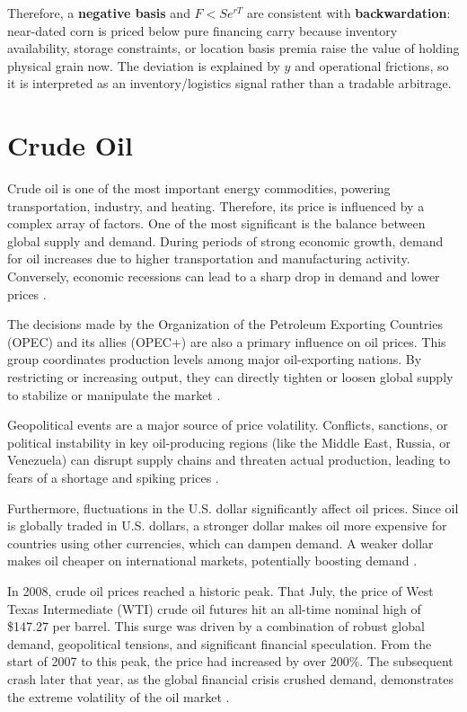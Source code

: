 \documentclass[10pt,a4paper]{article} %
\begin{document}
Therefore, a \textbf{negative basis} and $F<S e^{rT}$ are consistent with \textbf{backwardation}: near-dated corn is priced below pure financing carry because inventory availability, storage constraints, or location basis premia raise the value of holding physical grain now. The deviation is explained by $y$ and operational frictions, so it is interpreted as an inventory/logistics signal rather than a tradable arbitrage.


\section{Crude Oil}
Crude oil is one of the most important energy commodities, powering transportation, industry, and heating. Therefore, its price is influenced by a complex array of factors. One of the most significant is the balance between global supply and demand. During periods of strong economic growth, demand for oil increases due to higher transportation and manufacturing activity. Conversely, economic recessions can lead to a sharp drop in demand and lower prices \citep{eia_prices_2023}.

The decisions made by the Organization of the Petroleum Exporting Countries (OPEC) and its allies (OPEC+) are also a primary influence on oil prices. This group coordinates production levels among major oil-exporting nations. By restricting or increasing output, they can directly tighten or loosen global supply to stabilize or manipulate the market \citep{eia_opec_2024}.

Geopolitical events are a major source of price volatility. Conflicts, sanctions, or political instability in key oil-producing regions (like the Middle East, Russia, or Venezuela) can disrupt supply chains and threaten actual production, leading to fears of a shortage and spiking prices \citep{eia_prices_2023}.

Furthermore, fluctuations in the U.S. dollar significantly affect oil prices. Since oil is globally traded in U.S. dollars, a stronger dollar makes oil more expensive for countries using other currencies, which can dampen demand. A weaker dollar makes oil cheaper on international markets, potentially boosting demand \citep{bis_usd_commodity_2023,ecb_oil_usd_2024}.

In 2008, crude oil prices reached a historic peak. That July, the price of West Texas Intermediate (WTI) crude oil futures hit an all-time nominal high of \$147.27 per barrel. This surge was driven by a combination of robust global demand, geopolitical tensions, and significant financial speculation. From the start of 2007 to this peak, the price had increased by over 200\%. The subsequent crash later that year, as the global financial crisis crushed demand, demonstrates the extreme volatility of the oil market \citep{reuters_oil_peak_2008,worldbank_oil_spike_2008}.
\end{document}
